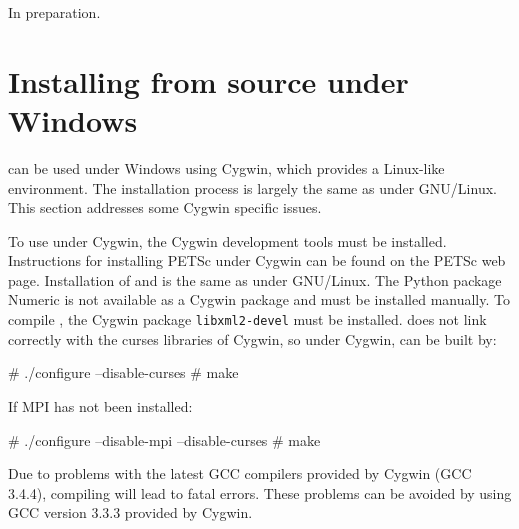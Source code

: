 In preparation.

\section{Installing from source under Windows}
\label{app:cygwin}

\dolfin{} can be used under Windows using Cygwin, which provides a Linux-like
environment. The installation process is largely the same as under GNU/Linux. 
This section addresses some Cygwin specific issues.

To use \dolfin{} under Cygwin, the Cygwin development tools must be installed. 
Instructions for installing PETSc under Cygwin can be found on the  PETSc web 
page. Installation of \ffc{} and \fiat{} is the same as under GNU/Linux. The 
Python package Numeric is not available as a Cygwin package and must be 
installed manually. To compile \dolfin{}, the Cygwin package  
\texttt{libxml2-devel} must be installed. \dolfin{} does not link correctly with 
the curses libraries of Cygwin, so under Cygwin, \dolfin{} can be built by:
\begin{code}
  # ./configure --disable-curses
  # make
\end{code}
If MPI has not been installed:
\begin{code}
  # ./configure --disable-mpi --disable-curses
  # make
\end{code}

Due to problems with the latest GCC compilers provided by Cygwin (GCC 3.4.4), compiling 
\dolfin{} will lead to fatal errors. These problems can be avoided by using GCC version 
3.3.3 provided by Cygwin.
